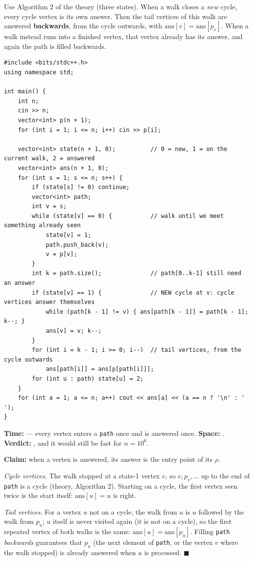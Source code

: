 \begin{algorithmbox}
Use Algorithm 2 of the theory (three states). When a walk closes a \emph{new} cycle, every cycle vertex is its own answer. Then the tail vertices of this walk are answered \textbf{backwards}, from the cycle outwards, with $\text{ans}[v] = \text{ans}[p_v]$. When a walk instead runs into a finished vertex, that vertex already has its answer, and again the path is filled backwards.

\begin{lstlisting}[style=cpp]
#include <bits/stdc++.h>
using namespace std;

int main() {
    int n;
    cin >> n;
    vector<int> p(n + 1);
    for (int i = 1; i <= n; i++) cin >> p[i];

    vector<int> state(n + 1, 0);          // 0 = new, 1 = on the current walk, 2 = answered
    vector<int> ans(n + 1, 0);
    for (int s = 1; s <= n; s++) {
        if (state[s] != 0) continue;
        vector<int> path;
        int v = s;
        while (state[v] == 0) {           // walk until we meet something already seen
            state[v] = 1;
            path.push_back(v);
            v = p[v];
        }
        int k = path.size();              // path[0..k-1] still need an answer
        if (state[v] == 1) {              // NEW cycle at v: cycle vertices answer themselves
            while (path[k - 1] != v) { ans[path[k - 1]] = path[k - 1]; k--; }
            ans[v] = v; k--;
        }
        for (int i = k - 1; i >= 0; i--)  // tail vertices, from the cycle outwards
            ans[path[i]] = ans[p[path[i]]];
        for (int u : path) state[u] = 2;
    }
    for (int a = 1; a <= n; a++) cout << ans[a] << (a == n ? '\n' : ' ');
}
\end{lstlisting}

\begin{complexitybox}
\textbf{Time:}  --- every vertex enters a \texttt{path} once and is answered once. \textbf{Space:} . \textbf{Verdict:} \ac{}, and it would still be fast for $n = 10^6$.
\end{complexitybox}
\end{algorithmbox}

\begin{invariantbox}
\textbf{Claim:} when a vertex is answered, its answer is the entry point of its $\rho$.

\emph{Cycle vertices.} The walk stopped at a state-1 vertex $v$, so $v, p_v, \dots$ up to the end of \texttt{path} is a cycle (theory, Algorithm 2). Starting on a cycle, the first vertex seen twice is the start itself: $\text{ans}[u] = u$ is right.

\emph{Tail vertices.} For a vertex $u$ not on a cycle, the walk from $u$ is $u$ followed by the walk from $p_u$; $u$ itself is never visited again (it is not on a cycle), so the first repeated vertex of both walks is the same: $\text{ans}[u] = \text{ans}[p_u]$. Filling \texttt{path} \emph{backwards} guarantees that $p_u$ (the next element of \texttt{path}, or the vertex $v$ where the walk stopped) is already answered when $u$ is processed. \hfill$\blacksquare$
\end{invariantbox}

